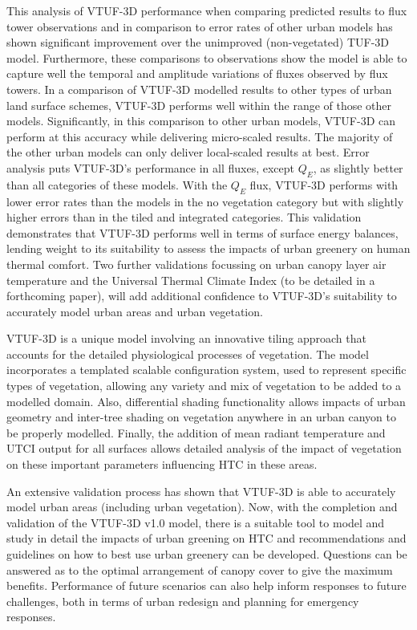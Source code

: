 \documentclass[final,3p,times,authoryear]{elsarticle}
\begin{document}
This analysis of VTUF-3D performance when comparing predicted results to flux tower observations and in comparison to error rates of other urban models has shown significant improvement over the unimproved (non-vegetated) TUF-3D model. Furthermore, these comparisons to observations show the model is able to capture well the temporal and amplitude variations of fluxes observed by flux towers. In a comparison of VTUF-3D modelled results to other types of urban land surface schemes, VTUF-3D performs well within the range of those other models. Significantly, in this comparison to other urban models, VTUF-3D can perform at this accuracy while delivering micro-scaled results. The majority of the other urban models can only deliver local-scaled results at best. Error analysis puts VTUF-3D's performance in all fluxes, except $Q_{E}$, as slightly better than all categories of these models. With the $Q_{E}$ flux, VTUF-3D performs with lower error rates than the models in the no vegetation category but with slightly higher errors than in the tiled and integrated categories. This validation demonstrates that VTUF-3D performs well in terms of surface energy balances, lending weight to its suitability to assess the impacts of urban greenery on human thermal comfort. Two further validations focussing on urban canopy layer air temperature and the Universal Thermal Climate Index (to be detailed in a forthcoming paper), will add additional confidence to VTUF-3D's suitability to accurately model urban areas and urban vegetation.

VTUF-3D is a unique model involving an innovative tiling approach that accounts for the detailed physiological processes of vegetation. The model incorporates a templated scalable configuration system, used to represent specific types of vegetation, allowing any variety and mix of vegetation to be added to a modelled domain. Also, differential shading functionality allows impacts of urban geometry and inter-tree shading on vegetation anywhere in an urban canyon to be properly modelled. Finally, the addition of mean radiant temperature and UTCI output for all surfaces allows detailed analysis of the impact of vegetation on these important parameters influencing HTC in these areas.

An extensive validation process has shown that VTUF-3D is able to accurately model urban areas (including urban vegetation). Now, with the completion and validation of the VTUF-3D v1.0 model, there is a suitable tool to model and study in detail the impacts of urban greening on HTC and recommendations and guidelines on how to best use urban greenery can be developed. Questions can be answered as to the optimal arrangement of canopy cover to give the maximum benefits. Performance of future scenarios can also help inform responses to future challenges, both in terms of urban redesign and planning for emergency responses.
\end{document}
